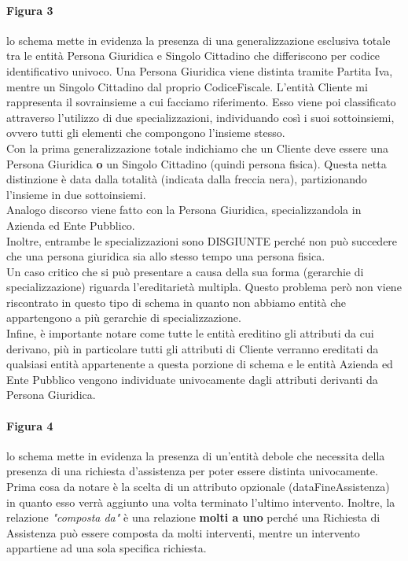 \documentclass[legalpaper]{article}
\begin{document}
\paragraph{Figura 3}
lo schema mette in evidenza la presenza di una generalizzazione esclusiva totale tra le entità Persona Giuridica e Singolo Cittadino che differiscono per codice identificativo univoco. Una Persona Giuridica viene distinta tramite Partita Iva, mentre un Singolo Cittadino dal proprio CodiceFiscale.
L'entità Cliente mi rappresenta il sovrainsieme a cui facciamo riferimento. Esso viene poi classificato attraverso l'utilizzo di due specializzazioni, individuando così i suoi sottoinsiemi, ovvero tutti gli elementi che compongono l'insieme stesso. \\
		Con la prima generalizzazione totale indichiamo che un Cliente deve essere una Persona Giuridica \textbf{o} un Singolo Cittadino (quindi persona fisica). Questa netta distinzione è data dalla totalità (indicata dalla freccia nera), partizionando l'insieme in due sottoinsiemi.\\
		Analogo discorso viene fatto con la Persona Giuridica, specializzandola in Azienda ed Ente Pubblico.\\
		Inoltre, entrambe le specializzazioni sono DISGIUNTE perché non può succedere che una persona giuridica sia allo stesso tempo una persona fisica.\\
		Un caso critico che si può presentare a causa della sua forma (gerarchie di specializzazione) riguarda l'ereditarietà multipla. Questo problema però non viene riscontrato in questo tipo di schema in quanto non abbiamo entità che appartengono a più gerarchie di specializzazione.\\
		Infine, è importante notare come tutte le entità ereditino gli attributi da cui derivano, più in particolare tutti gli attributi di Cliente verranno ereditati da qualsiasi entità appartenente a questa porzione di schema e le entità Azienda ed Ente Pubblico vengono individuate univocamente dagli attributi derivanti da Persona Giuridica.\\
\paragraph{Figura 4} 
lo schema mette in evidenza la presenza di un'entità debole che necessita della presenza di una richiesta d'assistenza per poter essere distinta univocamente.
Prima cosa da notare è la scelta di un attributo opzionale (dataFineAssistenza) in quanto esso verrà aggiunto una volta terminato l'ultimo intervento.
		Inoltre, la relazione \textit{"composta da"} è una relazione \textbf{molti a uno} perché una Richiesta di Assistenza può essere composta da molti interventi, mentre un intervento 
		appartiene ad una sola specifica richiesta.\\
		
\end{document}

